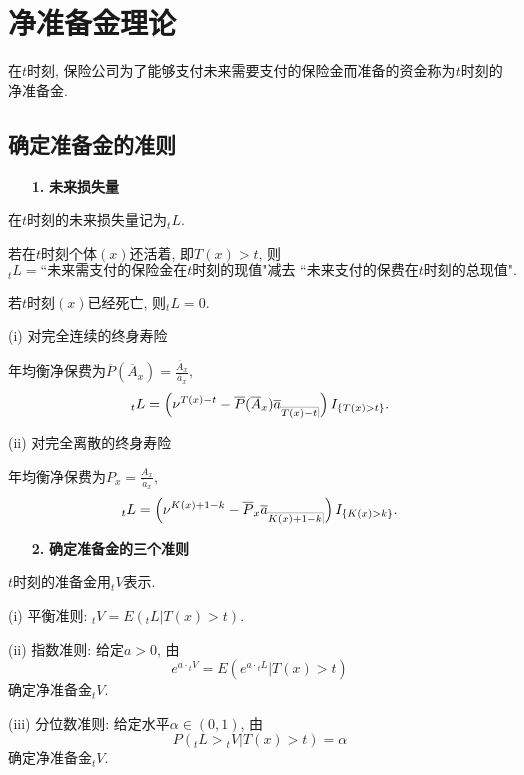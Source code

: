 \documentclass[a4paper,openany, 10pt]{ctexbook}
\makeatletter
\newcommand{\hei}{\CJKfamily{hei}}      %
\def\z{\left}
\def\y{\right}
\DeclareRobustCommand{\annu}[1]{_{%
    \def\arraystretch{0}%
    \setlength\arraycolsep{1pt}%
    \setlength\arrayrulewidth{.2pt}%
    \begin{array}[b]{@{}c|}\hline
        \\[\arraycolsep]%
        \scriptstyle #1%
    \end{array}%
}}
\makeatother
\begin{document}
\chapter{净准备金理论}

在$t$时刻, 保险公司为了能够支付未来需要支付的保险金而准备的资金称为$t$时刻的净准备金.
\section{确定准备金的准则}
\begin{itemize}
    \item[{\bf\hei 1.}]{\bf\hei 未来损失量}
\end{itemize}

在$t$时刻的未来损失量记为$_tL$.

 若在$t$时刻个体$(x)$还活着, 即$T(x)>t$, 则$${}_tL=\text{``未来需支付的保险金在$t$时刻的现值"减去 ``未来支付的保费在}t\text{时刻的总现值".}$$

若$t$时刻$(x)$已经死亡, 则${}_tL=0.$

(i) 对完全连续的终身寿险

年均衡净保费为$\overline{P}( \overline{A}_x )=\frac{\overline A_x}{\overline a_x},$
$${}_tL=\z(\nu^{T(x)-t}-\overline{P}( \overline{A}_x )\overline a_{\annu {T(x)-t}}\y)I_{\{T(x)>t\}}.$$

(ii) 对完全离散的终身寿险

年均衡净保费为$P_x=\frac{A_x}{\ddot{a}_x},$
$${}_tL=\z(\nu^{K(x)+1-k}-\overline{P}_x \overline a_{\annu {K(x)+1-k}}\y)I_{\{K(x)>k\}}.$$

\begin{itemize}
    \item[{\bf\hei  2.}]{\bf\hei 确定准备金的三个准则}
\end{itemize}

$t$时刻的准备金用${}_tV$表示.

(i) 平衡准则: ${}_tV=E({}_tL|T(x)>t).$

(ii) 指数准则: 给定$a>0$, 由$$e^{a\cdot{}_tV}=E(e^{a\cdot{}_tL}|T(x)>t)$$确定净准备金${}_tV.$

(iii) 分位数准则: 给定水平$\alpha\in(0,1)$, 由$$P({}_tL>{}_tV|T(x)>t)=\alpha$$确定净准备金${}_tV.$
\end{document}
